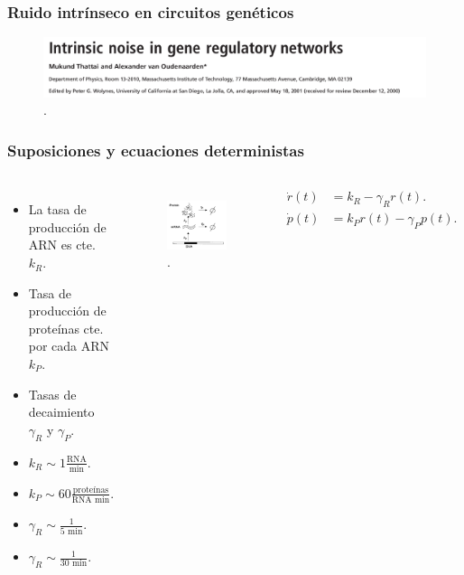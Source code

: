 \documentclass[10pt]{beamer}
\begin{document}
\begin{frame}
\frametitle{Ruido intr\'inseco en circuitos gen\'eticos}
\begin{figure}[p]
    \centering
    \includegraphics[width=1\textwidth]{title.png}\\
    \tiny \cite{thattai01}.
\end{figure}
\end{frame}

\begin{frame}
\frametitle{Suposiciones y ecuaciones deterministas}
\begin{columns}[c]
\begin{itemize}
\item La tasa de producci\'on de ARN es cte. $k_R$. 
\item Tasa de producci\'on de prote\'inas cte. por cada ARN $k_P$.
\item Tasas de decaimiento $\gamma_R$ y $\gamma_P$.
\item $k_R \sim 1 \frac{\text{RNA}}{\text{min}}.$
\item $k_P \sim 60 \frac{\text{prote\'inas}}{\text{RNA min}}.$
\item $\gamma_R \sim \frac{1}{5\text{ min}}.$
\item $\gamma_R \sim \frac{1}{30\text{ min}}.$
\end{itemize}
\begin{figure}[p]
    \centering
    \includegraphics[width=1\textwidth]{expressionsimple.png}\\
    \tiny \cite{thattai01}.
\end{figure}
\begin{align*}
\dot{r}(t) &= k_R - \gamma_Rr(t).\\
\dot{p}(t) &= k_Pr(t) - \gamma_Pp(t).
\end{align*}
\end{columns}
\end{frame}
\end{document}
